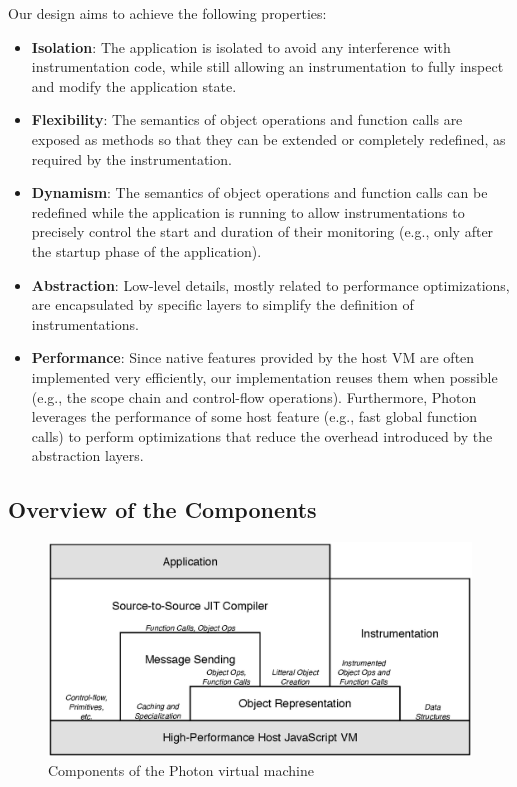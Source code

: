 Our design aims to achieve the following properties:
\begin{itemize}
    \item \textbf{Isolation}: The application is isolated to avoid any
        interference with instrumentation code, while still allowing an
        instrumentation to fully inspect and modify the application state.
    \item \textbf{Flexibility}: The semantics of object operations and function
        calls are exposed as methods so that they can be extended or
        completely redefined, as required by the instrumentation.
    \item \textbf{Dynamism}: The semantics of object operations and function
        calls can be redefined while the application is running to allow
        instrumentations to precisely control the start and duration
        of their monitoring (e.g., only after the startup phase of the application).
    \item \textbf{Abstraction}: Low-level details, mostly related to
        performance optimizations, are encapsulated by specific layers to
        simplify the definition of instrumentations.
    \item \textbf{Performance}:
        Since native features provided by the host VM are often implemented
        very efficiently, our implementation reuses them when possible (e.g.,
        the scope chain and control-flow operations). Furthermore, Photon
        leverages the performance of some host feature (e.g., fast global
        function calls) to perform optimizations that reduce the overhead
        introduced by the abstraction layers.
\end{itemize}

\subsection{Overview of the Components}

\begin{figure}[tbp]
\begin{center}
\includegraphics[width=.85\textwidth]{figures/architecture_simplified}
\caption{\label{fig:Architecture} Components of the Photon virtual machine}
\end{center}
\end{figure}

